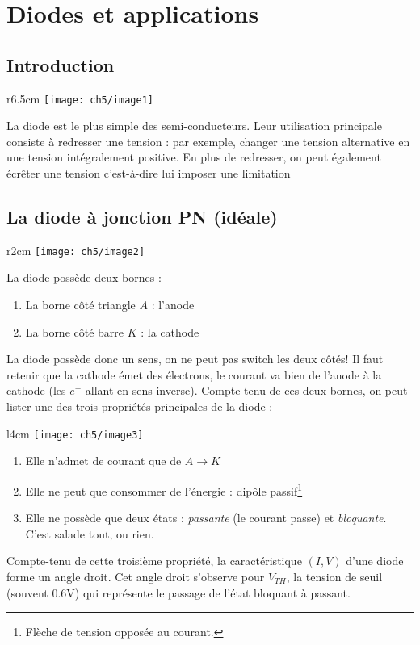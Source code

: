 \chapter{Diodes et applications}

	\section{Introduction}
	\begin{wrapfigure}[6]{r}{6.5cm}
	\vspace{-0.5cm}
	\texttt{[image: ch5/image1]}
	\end{wrapfigure}
	La diode est le plus simple des semi-conducteurs. Leur utilisation principale 
	consiste à redresser une tension : par exemple, changer une tension alternative 
	en une tension intégralement positive. En plus de redresser, on peut également 
	écrêter une tension c'est-à-dire lui imposer une limitation
	
	\section{La diode à jonction PN (idéale)}
	\begin{wrapfigure}[2]{r}{2cm}
	\vspace{-0.5cm}
	\texttt{[image: ch5/image2]}
	\end{wrapfigure}
	La diode possède deux bornes : 
	\begin{enumerate}
	\item La borne côté triangle $A$ : l'anode
	\item La borne côté barre $K$ : la cathode
	\end{enumerate}
	La diode possède donc un sens, on ne peut pas switch les deux côtés! Il faut 
	retenir que la cathode émet des électrons, le courant va bien de l'anode à 
	la cathode (les $e^-$ allant en sens inverse). Compte tenu de ces deux bornes, 
	on peut lister une des trois propriétés principales de la diode :
	\begin{wrapfigure}[8]{l}{4cm}
	\vspace{-0.5cm}
	\texttt{[image: ch5/image3]}
	\end{wrapfigure}
	\begin{enumerate}
	\item Elle n'admet de courant que de $A \rightarrow K$
	\item Elle ne peut que consommer de l'énergie : dipôle passif\footnote{Flèche de 
	tension opposée au courant.}
	\item Elle ne possède que deux états : \textit{passante} (le courant passe) et 
	\textit{bloquante}. C'est salade tout, ou rien.
	\end{enumerate}
	Compte-tenu de cette troisième propriété, la caractéristique $(I,V)$ d'une diode 
	forme un angle droit. Cet angle droit s'observe pour $V_{TH}$, la tension de 
	seuil (souvent 0.6V) qui représente le passage de l'état bloquant à passant.
	
